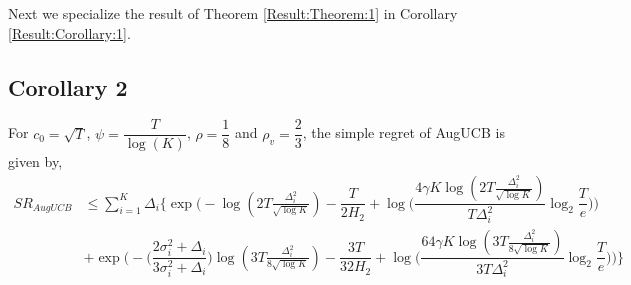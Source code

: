 	Next we specialize the result of Theorem \ref{Result:Theorem:1} in Corollary \ref{Result:Corollary:1}.

\subsection{Corollary 2}


\begin{corollary}
\label{Result:Corollary:1}
For $c_{0}=\sqrt{T}$, $\psi=\dfrac{T}{\log (K)}$, $\rho=\dfrac{1}{8}$ and $\rho_v=\dfrac{2}{3}$, the simple regret of AugUCB is given by,
\begin{align*}
SR_{AugUCB} &\leq  \sum_{i=1}^{K} \Delta_{i}\bigg\lbrace\exp\bigg(-\log ( 2T\frac{\Delta_{i}^{2}}{\sqrt{\log K}})-\dfrac{T}{2 H_{2}} + \log \big( \dfrac{4\gamma K\log ( 2T \frac{\Delta_{i}^{2}}{\sqrt{\log K}})}{T\Delta_{i}^{2}}\log_{2}\dfrac{T}{e} \big) \bigg)\\
& +  \exp\bigg(- \bigg(\dfrac{2\sigma_{i}^{2}+\Delta_{i}}{3\sigma_{i}^{2}+\Delta_{i}}\bigg)\log( 3T\frac{\Delta_{i}^{2}}{8\sqrt{\log K}}) -\dfrac{3T}{32 H_{2}} + \log\big ( \dfrac{64\gamma K\log ( 3T \frac{\Delta_{i}^{2}}{8\sqrt{\log K}})}{3T\Delta_{i}^{2}}\log_{2}\dfrac{T}{e} \big)  \bigg)\bigg\rbrace
\end{align*}
\end{corollary}

